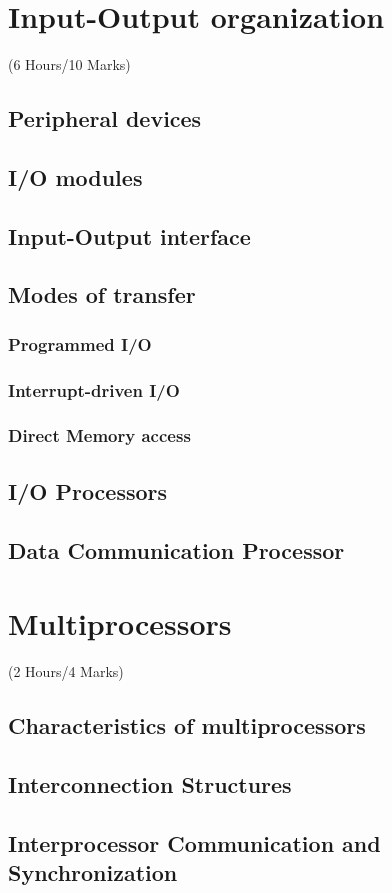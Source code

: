 \documentclass[12pt]{article}
\begin{document}
\pagebreak
\section{Input-Output organization}
\begin{center}(6 Hours/10 Marks)\end{center}
\subsection{Peripheral devices}
\subsection{I/O modules}
\subsection{Input-Output interface}
\subsection{Modes of transfer}
\subsubsection{Programmed I/O}
\subsubsection{Interrupt-driven I/O}
\subsubsection{Direct Memory access}
\subsection{I/O Processors}
\subsection{Data Communication Processor}

\pagebreak
\section{Multiprocessors}
\begin{center}(2 Hours/4 Marks)\end{center}
\subsection{Characteristics of multiprocessors}
\subsection{Interconnection Structures}
\subsection{Interprocessor Communication and Synchronization}
\end{document}
